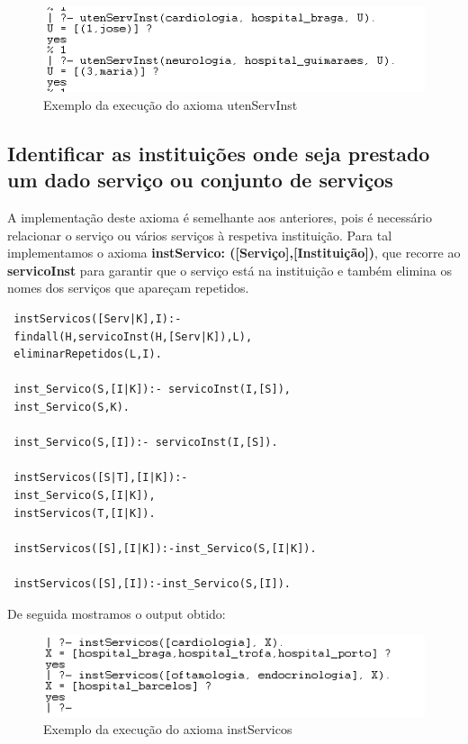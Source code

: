 \begin{figure}[<+htpb+>]
	\centering
	\includegraphics[scale=0.9]{answer4.png}
	\caption{Exemplo da execução do axioma utenServInst}
	\label{p3:fig:output4}
\end{figure}


\subsection{Identificar as instituições onde seja prestado um dado serviço ou conjunto de serviços}
A implementação deste axioma é semelhante aos anteriores, pois é necessário relacionar o serviço ou vários serviços à respetiva instituição. Para tal implementamos o axioma \textbf{instServico: ([Serviço],[Instituição])}, que recorre ao \textbf{servicoInst} para garantir que o serviço está na instituição e também elimina os nomes dos serviços que apareçam repetidos. 


\begin{verbatim}
 instServicos([Serv|K],I):-    
 findall(H,servicoInst(H,[Serv|K]),L),
 eliminarRepetidos(L,I).
 
 inst_Servico(S,[I|K]):- servicoInst(I,[S]),
 inst_Servico(S,K).  
 
 inst_Servico(S,[I]):- servicoInst(I,[S]).
 
 instServicos([S|T],[I|K]):-
 inst_Servico(S,[I|K]),
 instServicos(T,[I|K]).
 
 instServicos([S],[I|K]):-inst_Servico(S,[I|K]).
 
 instServicos([S],[I]):-inst_Servico(S,[I]).
\end{verbatim}

De seguida mostramos o output obtido: 

\begin{figure}[<+htpb+>]
	\centering
	\includegraphics[scale=0.9]{answer5.png}
	\caption{Exemplo da execução do axioma instServicos}
	\label{p3:fig:output5}
\end{figure}

